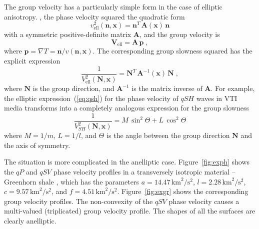The group velocity has a particularly simple form in the case of elliptic
anisotropy. , the phase velocity squared  the
quadratic form
\begin{equation}
  \label{eq:ellips}
  v_{\mbox{ell}}^2(\mathbf{n},\mathbf{x}) = 
  \mathbf{n}^T\,\mathbf{A}(\mathbf{x})\,\mathbf{n}
\end{equation}
with a symmetric positive-definite matrix $\mathbf{A}$, and the group
velocity is 
\begin{equation}
  \label{eq:ellf}
  \mathbf{V}_{\mbox{ell}} = \mathbf{A}\,\mathbf{p}\;, 
\end{equation}
where $\mathbf{p} = \nabla T = \mathbf{n}/v(\mathbf{n},\mathbf{x})$.
The corresponding group slowness squared has the explicit expression
\begin{equation}
  \label{eq:ellv}
  \frac{1}{V_{\mbox{ell}}^2(\mathbf{N},\mathbf{x})} = 
    \mathbf{N}^T\,\mathbf{A}^{-1}(\mathbf{x})\,\mathbf{N}\;, 
\end{equation}
where $\mathbf{N}$ is the group direction, and $\mathbf{A}^{-1}$ is the matrix
inverse of $\mathbf{A}$. For example, the elliptic expression~(\ref{eq:qsh}) for
the phase velocity of $qSH$ waves in VTI media transforms into a completely
analogous expression for the group slowness
\begin{equation}
  \label{eq:ellsh}
  \frac{1}{V_{SH}^2(\mathbf{N},\mathbf{x})}  = 
  M\,\sin^2{\Theta} + L\,\cos^2{\Theta}
\end{equation}
where $M=1/m$, $L=1/l$, and $\Theta$ is the angle between the group direction
$\mathbf{N}$ and the axis of symmetry.


The situation is more complicated in the anelliptic case.
Figure~\ref{fig:exph} shows the $qP$ and $qSV$ phase velocity profiles in a
transversely isotropic material -- Greenhorn shale \cite[]{GEO46-03-02880297},
which has the parameters $a=14.47\,\mbox{km}^2/\mbox{s}^2$,
$l=2.28\,\mbox{km}^2/\mbox{s}^2$, $c=9.57\,\mbox{km}^2/\mbox{s}^2$, and
$f=4.51\,\mbox{km}^2/\mbox{s}^2$. Figure~\ref{fig:exgr} shows the
corresponding group velocity profiles. The non-convexity of the $qSV$ phase
velocity causes a multi-valued (triplicated) group velocity profile. The
shapes of all the surfaces are clearly anelliptic.



